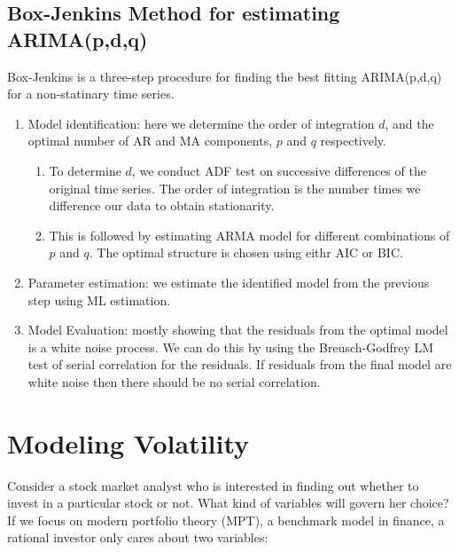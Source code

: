 \documentclass[]{book}
\providecommand{\tightlist}{%
  \setlength{\itemsep}{0pt}\setlength{\parskip}{0pt}}
\theoremstyle{definition}
\theoremstyle{definition}
\theoremstyle{definition}
\theoremstyle{remark}
\begin{document}
\hypertarget{box-jenkins-method-for-estimating-arimapdq}{%
\section{Box-Jenkins Method for estimating
ARIMA(p,d,q)}\label{box-jenkins-method-for-estimating-arimapdq}}

Box-Jenkins is a three-step procedure for finding the best fitting
ARIMA(p,d,q) for a non-statinary time series.

\begin{enumerate}
\def\labelenumi{\arabic{enumi}.}
\item
  Model identification: here we determine the order of integration
  \(d\), and the optimal number of AR and MA components, \(p\) and \(q\)
  respectively.

  \begin{enumerate}
  \def\labelenumii{\roman{enumii}.}
  \tightlist
  \item
    To determine \(d\), we conduct ADF test on successive differences of
    the original time series. The order of integration is the number
    times we difference our data to obtain stationarity.
  \item
    This is followed by estimating ARMA model for different combinations
    of \(p\) and \(q\). The optimal structure is chosen using eithr AIC
    or BIC.
  \end{enumerate}
\item
  Parameter estimation: we estimate the identified model from the
  previous step using ML estimation.
\item
  Model Evaluation: mostly showing that the residuals from the optimal
  model is a white noise process. We can do this by using the
  Breusch-Godfrey LM test of serial correlation for the residuals. If
  residuals from the final model are white noise then there should be no
  serial correlation.
\end{enumerate}

\hypertarget{modeling-volatility}{%
\chapter{Modeling Volatility}\label{modeling-volatility}}

Consider a stock market analyst who is interested in finding out whether
to invest in a particular stock or not. What kind of variables will
govern her choice? If we focus on modern portfolio theory (MPT), a
benchmark model in finance, a rational investor only cares about two
variables:
\end{document}
